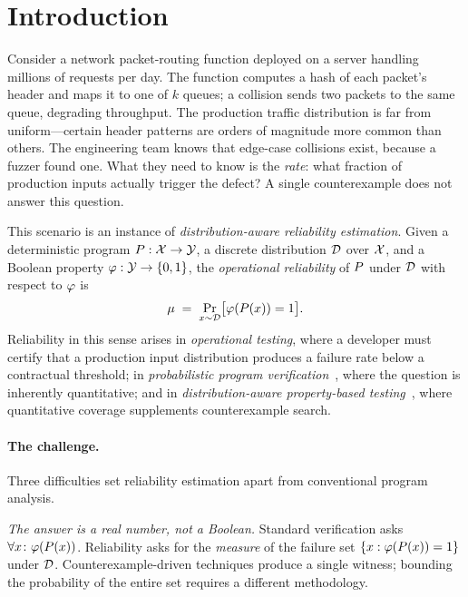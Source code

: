 \section{Introduction}\label{sec:intro}

Consider a network packet-routing function deployed on a server
handling millions of requests per day.  The function computes a hash
of each packet's header and maps it to one of $k$ queues; a collision
sends two packets to the same queue, degrading throughput.  The
production traffic distribution is far from uniform---certain header
patterns are orders of magnitude more common than others.  The
engineering team knows that edge-case collisions exist, because a
fuzzer found one.  What they need to know is the \emph{rate}: what
fraction of production inputs actually trigger the defect?  A single
counterexample does not answer this question.

This scenario is an instance of \emph{distribution-aware reliability
  estimation}.  Given a deterministic program $P : \mathcal{X} \to \mathcal{Y}$,
a discrete distribution $\mathcal{D}$ over $\mathcal{X}$, and a Boolean property
$\varphi : \mathcal{Y} \to \{0,1\}$, the \emph{operational reliability} of
$P$ under $\mathcal{D}$ with respect to $\varphi$ is
\begin{equation}\label{eq:mu-def}
  \mu \;=\; \Pr_{x \sim \mathcal{D}}\!\big[\varphi(P(x)) = 1\big].
\end{equation}
Reliability in this sense arises in \emph{operational testing}, where
a developer must certify that a production input distribution produces
a failure rate below a contractual threshold; in \emph{probabilistic
  program
  verification}~\cite{geldenhuys2012pse,filieri2015tacas}, where the
question is inherently quantitative; and in \emph{distribution-aware
  property-based
  testing}~\cite{maciver2019hypothesis,claessen2000quickcheck}, where
quantitative coverage supplements counterexample search.

\paragraph{The challenge.}
Three difficulties set reliability estimation apart from conventional
program analysis.

\emph{The answer is a real number, not a Boolean.}  Standard
verification asks $\forall x\colon \varphi(P(x))$.  Reliability asks
for the \emph{measure} of the failure set $\{x : \varphi(P(x))=1\}$
under $\mathcal{D}$.  Counterexample-driven techniques produce a single
witness; bounding the probability of the entire set requires a
different methodology.

